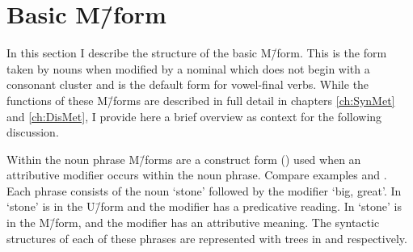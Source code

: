 \section{Basic M\=/form}\label{sec:BasMfo}
In this section I describe the structure of the basic M\=/form.
This is the form taken by nouns when modified by a nominal
which does not begin with a consonant cluster
and is the default form for vowel-final verbs.
While the functions of these M\=/forms are described
in full detail in chapters \ref{ch:SynMet} and \ref{ch:DisMet},
I provide here a brief overview as context for the following discussion.

Within the noun phrase M\=/forms are a construct form ()
used when an attributive modifier occurs within the noun phrase.
Compare examples  and .
Each phrase consists of the noun  {\tl}  `stone'
followed by the modifier  `big, great'.
In   `stone' is in the U\=/form
and the modifier has a predicative reading.
In   `stone' is in the M\=/form,
and the modifier has an attributive meaning.
The syntactic structures of each of these phrases
are represented with trees in  and  respectively.

\begin{multicols}{2}
	\begin{exe}
		\label{ex:StoAreBig}
		\label{ex:BigSto}
	\end{exe}
\end{multicols}

\begin{multicols}{2}
	\begin{exe}
		\label{tr:StoAreBig}
		\label{tr:BigSto}
	\end{exe}
\end{multicols}

